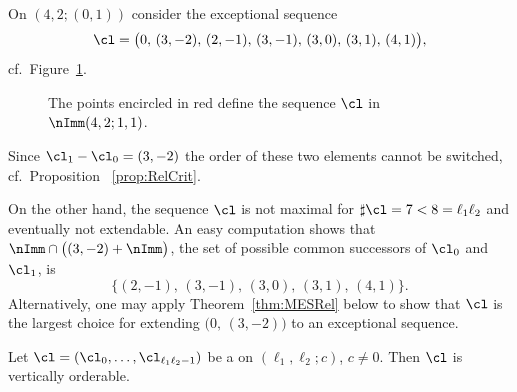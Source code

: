 \begin{exam}
\label{exam:NexNmax}
On $(4,2;(0,1))$ consider the exceptional 
sequence
$$
\cl=\big(0,\,(3,-2),\,(2,-1),\,(3,-1),
\,(3,0),\,(3,1),\,(4,1)\big),
$$
cf.\ Figure~\ref{fig:SharpEstimate}.
\begin{figure}[ht]
\caption{The points encircled in 
red define the sequence $\cl$ in 
$\nImm(4,2;1,1)$.}
\label{fig:SharpEstimate}
\end{figure}
Since $\cl_1-\cl_0=(3,-2)$ the 
order of these two elements cannot 
be switched, cf.\ Proposition
~\ref{prop:RelCrit}. 

On the other hand, the sequence 
$\cl$ is not maximal for 
$\sharp\cl=7<8=\ell_1\ell_2$ and eventually 
not extendable. An easy computation 
shows that $\nImm\cap\big((3,-2)+\nImm\big)$,
the set of possible common successors of 
$\cl_0$ and $\cl_1$, is
$$
\{(2,-1),\,(3,-1),\,(3,0),\,(3,1),\,(4,1)\}.
$$
Alternatively, one may apply
Theorem~\ref{thm:MESRel} below
to show that $\cl$ is the largest 
choice for extending $\big(0,\,(3,-2)\big)$ 
to an exceptional sequence.
\end{exam}

\begin{theorem}
\label{thm:MESRel}
Let $\cl=(\cl_0,\ldots,\cl_{\ell_1\ell_2-1})$ be 
a {\mes} on $(\ell_1,\ell_2;c)$, $c\not=0$. 
Then $\cl$ is vertically orderable.
\end{theorem}

